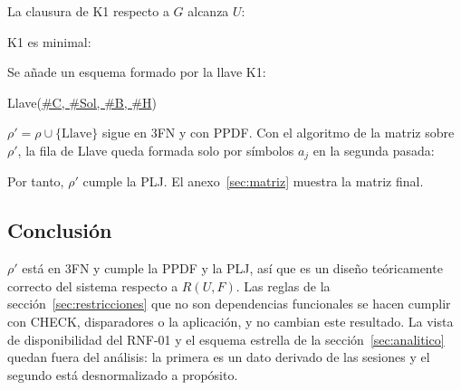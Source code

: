 La clausura de K1 respecto a $G$ alcanza $U$:



K1 es minimal: 

Se añade un esquema formado por la llave K1:
\begin{center}
  Llave(\underline{\#C, \#Sol, \#B, \#H})
\end{center}
$\rho' = \rho \cup \{\text{Llave}\}$ sigue en 3FN y con PPDF. Con el algoritmo de la matriz sobre $\rho'$, la fila de Llave queda formada solo por símbolos $a_j$ en la segunda pasada:



Por tanto, $\rho'$ cumple la PLJ. El anexo~\ref{sec:matriz} muestra la matriz final.

\subsection{Conclusión}

$\rho'$ está en 3FN y cumple la PPDF y la PLJ, así que es un diseño teóricamente correcto del sistema respecto a $R(U, F)$. Las reglas de la sección~\ref{sec:restricciones} que no son dependencias funcionales se hacen cumplir con CHECK, disparadores o la aplicación, y no cambian este resultado. La vista de disponibilidad del RNF-01 y el esquema estrella de la sección~\ref{sec:analitico} quedan fuera del análisis: la primera es un dato derivado de las sesiones y el segundo está desnormalizado a propósito.
